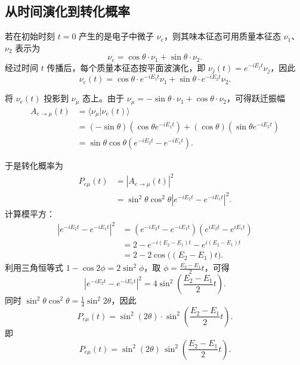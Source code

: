 \subsection{从时间演化到转化概率}

若在初始时刻 $t=0$ 产生的是电子中微子 $\nu_e$，则其味本征态可用质量本征态 $\nu_1$、$\nu_2$ 表示为
\[
\nu_e = \cos\theta \cdot \nu_1 + \sin\theta \cdot \nu_2.
\]
经过时间 $t$ 传播后，每个质量本征态按平面波演化，即 $\nu_j(t) = e^{-i E_j t} \nu_j$，因此
\[
\nu_e(t) = \cos\theta \cdot e^{-i E_1 t} \nu_1 + \sin\theta \cdot e^{-i E_2 t} \nu_2.
\]

将 $\nu_e(t)$ 投影到 $\nu_\mu$ 态上。由于 $\nu_\mu = -\sin\theta \cdot \nu_1 + \cos\theta \cdot \nu_2$，可得跃迁振幅
\begin{align*}
A_{e \to \mu}(t) &= \langle \nu_\mu | \nu_e(t) \rangle \\
&= (-\sin\theta)(\cos\theta e^{-i E_1 t}) + (\cos\theta)(\sin\theta e^{-i E_2 t}) \\
&= \sin\theta\cos\theta \left( e^{-i E_2 t} - e^{-i E_1 t} \right).
\end{align*}

于是转化概率为
\begin{align*}
P_{e\mu}(t) &= |A_{e \to \mu}(t)|^2 \\
&= \sin^2\theta\cos^2\theta \left| e^{-i E_2 t} - e^{-i E_1 t} \right|^2.
\end{align*}
计算模平方：
\begin{align*}
\left| e^{-i E_2 t} - e^{-i E_1 t} \right|^2 
&= \left( e^{-i E_2 t} - e^{-i E_1 t} \right) \left( e^{i E_2 t} - e^{i E_1 t} \right) \\
&= 2 - e^{-i (E_2 - E_1) t} - e^{i (E_2 - E_1) t} \\
&= 2 - 2\cos\big( (E_2 - E_1) t \big).
\end{align*}
利用三角恒等式 $1 - \cos 2\phi = 2\sin^2\phi$，取 $\phi = \frac{E_2 - E_1}{2} t$，可得
\[
\left| e^{-i E_2 t} - e^{-i E_1 t} \right|^2 = 4 \sin^2\!\left( \frac{E_2 - E_1}{2} t \right).
\]
同时 $\sin^2\theta\cos^2\theta = \frac{1}{4} \sin^2 2\theta$，因此
\[
P_{e\mu}(t) = \sin^2(2\theta) \cdot \sin^2\!\left( \frac{E_2 - E_1}{2} t \right).
\]
即
\begin{equation}\label{eq:probEt}
P_{e\mu}(t) = \sin^2(2\theta) \, \sin^2\!\left( \frac{E_2 - E_1}{2} t \right).
\end{equation}

